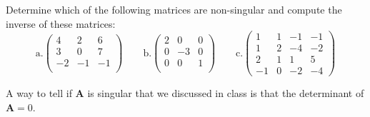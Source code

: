\documentclass[12pt, answers]{exam}
\newcommand{\ve}[1]{\ensuremath{\mathbf{#1}}}
\begin{document}
\begin{questions}

\addpoints
\question[10] 
Determine which of the following matrices are non-singular and compute the inverse of these matrices:
\newcommand{\aaa}{4}
\newcommand{\aab}{2}
\newcommand{\aac}{6}
\newcommand{\aba}{3}
\newcommand{\abb}{0}
\newcommand{\abc}{7}
\newcommand{\aca}{-2}
\newcommand{\acb}{-1}
\newcommand{\acc}{-1}
\newcommand{\baa}{2}
\newcommand{\bab}{0}
\newcommand{\bac}{0}
\newcommand{\bba}{0}
\newcommand{\bbb}{-3}
\newcommand{\bbc}{0}
\newcommand{\bca}{0}
\newcommand{\bcb}{0}
\newcommand{\bcc}{1}
\begin{equation}
\text{a.} \begin{pmatrix}
   \aaa & \aab & \aac \\
   \aba & \abb & \abc \\
   \aca & \acb & \acc \\
\end{pmatrix} \qquad
%
\text{b.} \begin{pmatrix}
   \baa & \bab & \bac \\
   \bba & \bbb & \bbc \\
   \bca & \bcb & \bcc \\
\end{pmatrix} \qquad
%
\text{c.} \begin{pmatrix}
  1  & 1 & -1 & -1 \\
  1  & 2 & -4 & -2 \\
  2  & 1 &  1 & 5 \\
  -1 & 0 & -2 & -4
\end{pmatrix} \nonumber
\end{equation}

\begin{solution}
A way to tell if $\ve{A}$ is singular that we discussed in class is that the determinant of $\ve{A}=0$.

\end{solution}
\end{questions}
\end{document}

